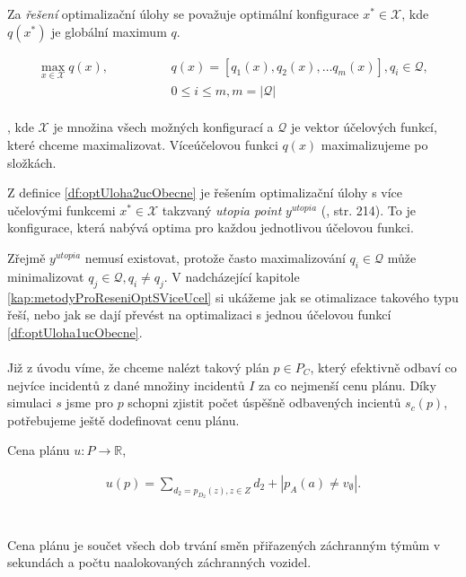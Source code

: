 \begin{definice}
  Za \textit{řešení} optimalizační úlohy se považuje optimální konfigurace $x^* \in \mathcal{X}$,
  kde $q(x^*)$ je globální maximum $q$.
  \\
\end{definice}

\begin{definice}\label{df:optUloha2ucObecne}
  \begin{align*}
    \max_{x \in \mathcal{X}} q(x), \hspace{50pt} &q(x) = [q_1(x), q_2(x), \dots q_{m}(x)], q_i \in \mathcal{Q}, \\
                                                 &0 \leq i \leq m, m = |\mathcal{Q}| 
  \end{align*}
  \\
  , kde $\mathcal{X}$ je množina všech možných konfigurací a $\mathcal{Q}$ je vektor účelových funkcí, které chceme maximalizovat.
  Víceúčelovou funkci $q(x)$ maximalizujeme po složkách.
\end{definice}

\begin{definice}
  Z definice \ref{df:optUloha2ucObecne} je řešením optimalizační úlohy s více učelovými funkcemi 
  $x^* \in \mathcal{X}$ takzvaný \textit{utopia point} $y^{utopia}$ (\citet{AlgOptBook}, str. 214).
  To je konfigurace, která nabývá optima pro každou jednotlivou účelovou funkci.
\end{definice}

Zřejmě $y^{utopia}$ nemusí existovat, protože často maximalizování $q_i \in \mathcal{Q}$ může minimalizovat $q_j \in \mathcal{Q}, q_i \neq q_j$.
V nadcházející kapitole \ref{kap:metodyProReseniOptSViceUcel} si ukážeme jak se otimalizace takového typu řeší, nebo jak se dají převést na 
optimalizaci s jednou účelovou funkcí \ref{df:optUloha1ucObecne}.
\\
\\
Již z úvodu víme, že chceme nalézt takový plán $p \in P_C$, který efektivně odbaví co nejvíce incidentů z dané množiny incidentů $I$ za co nejmenší cenu plánu.
Díky simulaci $s$ jsme pro $p$ schopni zjistit počet úspěšně odbavených incientů $s_c(p)$, potřebujeme ještě dodefinovat cenu plánu.
\\
\begin{definice}\label{df:cenaPlanu}
  Cena plánu $u \colon P \rightarrow \mathbb{R}$,

  \begin{align*}
    u(p) = \sum_{d_2 = p_{D_2}(z), z \in Z} d_2 + |p_{A}(a) \neq v_{\emptyset}|.
  \end{align*}
  \\
  \\
  Cena plánu je součet všech dob trvání směn přiřazených záchranným týmům v sekundách a počtu naalokovaných záchranných vozidel.
  \\
\end{definice}

